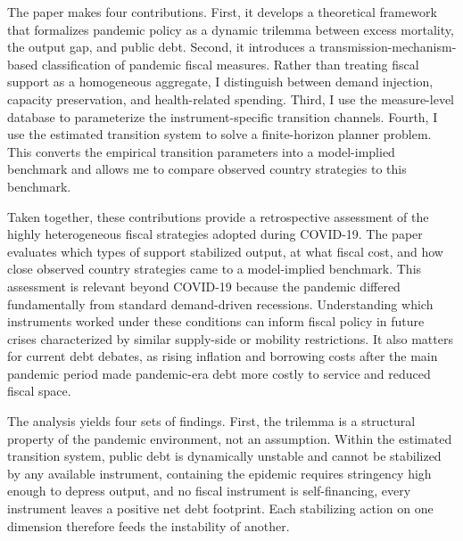 \documentclass[12pt, a4paper]{article}
\begin{document}
The paper makes four contributions. First, it develops a theoretical framework that formalizes pandemic policy as a dynamic trilemma between excess mortality, the output gap, and public debt. Second, it introduces a transmission-mechanism-based classification of pandemic fiscal measures. Rather than treating fiscal support as a homogeneous aggregate, I distinguish between demand injection, capacity preservation, and health-related spending. Third, I use the measure-level database to parameterize the instrument-specific transition channels. Fourth, I use the estimated transition system to solve a finite-horizon planner problem. This converts the empirical transition parameters into a model-implied benchmark and allows me to compare observed country strategies to this benchmark.

Taken together, these contributions provide a retrospective assessment of the highly heterogeneous fiscal strategies adopted during COVID-19. The paper evaluates which types of support stabilized output, at what fiscal cost, and how close observed country strategies came to a model-implied benchmark. This assessment is relevant beyond COVID-19 because the pandemic differed fundamentally from standard demand-driven recessions. Understanding which instruments worked under these conditions can inform fiscal policy in future crises characterized by similar supply-side or mobility restrictions. It also matters for current debt debates, as rising inflation and borrowing costs after the main pandemic period made pandemic-era debt more costly to service and reduced fiscal space.


The analysis yields four sets of findings. First, the trilemma is a structural property of the pandemic environment, not an assumption. Within the estimated transition system, public debt is dynamically unstable and cannot be stabilized by any available instrument, containing the epidemic requires stringency high enough to depress output, and no fiscal instrument is self-financing, every instrument leaves a positive net debt footprint. Each stabilizing action on one dimension therefore feeds the instability of another.
\end{document}
